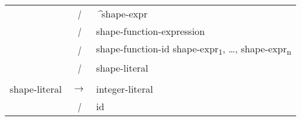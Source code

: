 \begin{tt}
{\begin{center}
\begin{longtable}{r c l}
& \emph{|} & \emph{\^}shape-expr \\
& \emph{|} & shape-function-expression \\
& \emph{|} & shape-function-id shape-expr\textsubscript{1}, \ldots, shape-expr\textsubscript{n} \\
& \emph{|} & shape-literal \\
& & \\
shape-literal & $\rightarrow$ & integer-literal \\
& \emph{|} & id \\
\end{longtable}
\end{center}
}
\end{tt}

